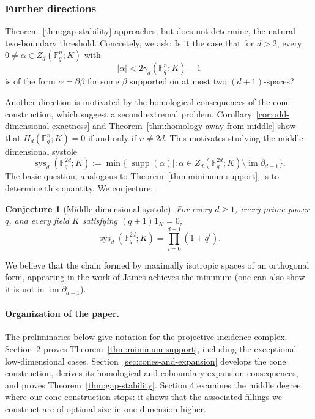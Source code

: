 \documentclass[11pt]{article}
\numberwithin{equation}{section}
\newtheorem{conjecture}[theorem]{Conjecture}
\newcommand{\F}{\mathbb F}
\begin{document}
\subsubsection*{Further directions}

Theorem~\ref{thm:gap-stability} approaches, but does not determine, the natural two-boundary threshold. Concretely, we ask: Is it the case that for $d>2$, every $0\ne\alpha\in Z_d(\F_q^n;K)$ with
\[
    |\alpha|<2\gamma_d(\F_q^n;K)-1
\]
is of the form $\alpha=\partial\beta$ for some $\beta$ supported on at most two $(d+1)$-spaces? 

Another direction is motivated by the homological consequences of the cone construction, which suggest a second extremal problem. Corollary~\ref{cor:odd-dimensional-exactness} and Theorem~\ref{thm:homology-away-from-middle} show that $H_d(\F_q^n;K)=0$ if and only if $n \neq 2d$. This motivates studying the middle-dimensional systole
\[
    \operatorname{sys}_d(\F_q^{2d};K)
    :=
    \min\bigl\{
        |\operatorname{supp}(\alpha)|:
        \alpha\in Z_d(\F_q^{2d};K)
        \setminus\operatorname{im}\partial_{d+1}
    \bigr\}.
\]
The basic question, analogous to Theorem~\ref{thm:minimum-support}, is to determine this quantity. We conjecture:

\begin{conjecture}[Middle-dimensional systole]
\label{conj:middle-dimensional-systole}
For every $d\ge1$, every prime power $q$, and every field $K$ satisfying $(q+1)1_K=0$,
\[
    \operatorname{sys}_d(\F_q^{2d};K)
    =
    \prod_{i=0}^{d-1}(1+q^i).
\]
\end{conjecture}

We believe that the chain formed by maximally isotropic spaces of an orthogonal form, appearing in the work of James  \cite{James1984} achieves the minimum (one can also show it is not in $\operatorname{im} \partial_{d+1}$).

\paragraph{Organization of the paper.}
The preliminaries below give notation for the projective incidence complex. Section~2 proves Theorem~\ref{thm:minimum-support}, including the exceptional low-dimensional cases. Section~\ref{sec:cones-and-expansion} develops the cone construction, derives its homological and coboundary-expansion consequences, and proves Theorem~\ref{thm:gap-stability}. Section 4 examines the middle degree, where our cone construction stops: it shows that the associated fillings we construct are of optimal size in one dimension higher. 
\end{document}
